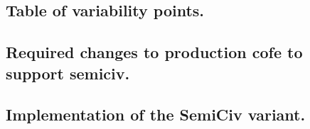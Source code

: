 \subsection*{ Table of variability points. }

\subsection*{ Required changes to production cofe to support semiciv. }

\subsection*{ Implementation of the SemiCiv variant. }



